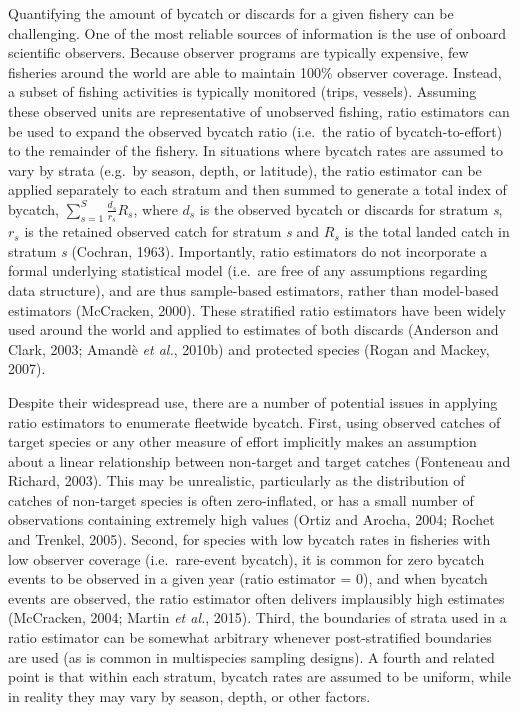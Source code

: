 \documentclass[]{article}
\begin{document}
Quantifying the amount of bycatch or discards for a given fishery can be
challenging. One of the most reliable sources of information is the use
of onboard scientific observers. Because observer programs are typically
expensive, few fisheries around the world are able to maintain 100\%
observer coverage. Instead, a subset of fishing activities is typically
monitored (trips, vessels). Assuming these observed units are
representative of unobserved fishing, ratio estimators can be used to
expand the observed bycatch ratio (i.e.~the ratio of bycatch-to-effort)
to the remainder of the fishery. In situations where bycatch rates are
assumed to vary by strata (e.g.~by season, depth, or latitude), the
ratio estimator can be applied separately to each stratum and then
summed to generate a total index of bycatch,
\(\sum_{ s=1 }^{ S }{ \frac { { d }_{ s } }{ { r }_{ s } } } { R }_{ s }\),
where \({ d }_{ s }\) is the observed bycatch or discards for stratum
\emph{s}, \({ r }_{ s }\) is the retained observed catch for stratum
\emph{s} and \({ R }_{ s }\) is the total landed catch in stratum
\emph{s} (Cochran, 1963). Importantly, ratio estimators do not
incorporate a formal underlying statistical model (i.e.~are free of any
assumptions regarding data structure), and are thus sample-based
estimators, rather than model-based estimators (McCracken, 2000). These
stratified ratio estimators have been widely used around the world and
applied to estimates of both discards (Anderson and Clark, 2003; Amandè
\emph{et al.}, 2010b) and protected species (Rogan and Mackey, 2007).

Despite their widespread use, there are a number of potential issues in
applying ratio estimators to enumerate fleetwide bycatch. First, using
observed catches of target species or any other measure of effort
implicitly makes an assumption about a linear relationship between
non-target and target catches (Fonteneau and Richard, 2003). This may be
unrealistic, particularly as the distribution of catches of non-target
species is often zero-inflated, or has a small number of observations
containing extremely high values (Ortiz and Arocha, 2004; Rochet and
Trenkel, 2005). Second, for species with low bycatch rates in fisheries
with low observer coverage (i.e.~rare-event bycatch), it is common for
zero bycatch events to be observed in a given year (ratio estimator =
0), and when bycatch events are observed, the ratio estimator often
delivers implausibly high estimates (McCracken, 2004; Martin \emph{et
al.}, 2015). Third, the boundaries of strata used in a ratio estimator
can be somewhat arbitrary whenever post-stratified boundaries are used
(as is common in multispecies sampling designs). A fourth and related
point is that within each stratum, bycatch rates are assumed to be
uniform, while in reality they may vary by season, depth, or other
factors.
\end{document}
